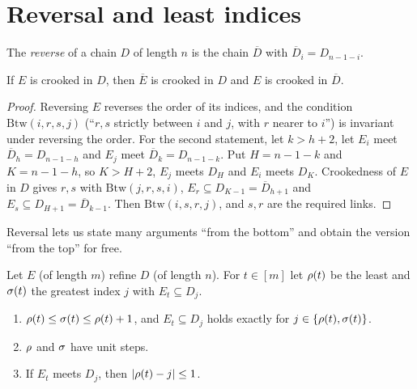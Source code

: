 
\section{Reversal and least indices}

\begin{definition}
The \emph{reverse} of a chain $D$ of length $n$ is the chain $\overline D$ with
$\overline D_i=D_{n-1-i}$.
\end{definition}

\begin{lemma}\label{lem:reverse}
If $E$ is crooked in $D$, then $\overline E$ is crooked in $D$ and $E$ is crooked in $\overline D$.
\end{lemma}

\begin{proof}
Reversing $E$ reverses the order of its indices, and the condition $\mathrm{Btw}(i,r,s,j)$ (``$r,s$ strictly
between $i$ and $j$, with $r$ nearer to $i$'') is invariant under reversing the order. For the second
statement, let $k>h+2$, let $E_i$ meet $\overline D_h=D_{n-1-h}$ and $E_j$ meet $\overline D_k=D_{n-1-k}$.
Put $H=n-1-k$ and $K=n-1-h$, so $K>H+2$, $E_j$ meets $D_H$ and $E_i$ meets $D_K$. Crookedness of $E$ in $D$
gives $r,s$ with $\mathrm{Btw}(j,r,s,i)$, $E_r\subseteq D_{K-1}=\overline D_{h+1}$ and $E_s\subseteq
D_{H+1}=\overline D_{k-1}$. Then $\mathrm{Btw}(i,s,r,j)$, and $s,r$ are the required links.
\end{proof}


Reversal lets us state many arguments ``from the bottom'' and obtain the version ``from the top'' for free.

\begin{definition}\label{def:minidx}
Let $E$ (of length $m$) refine $D$ (of length $n$). For $t\in[m]$ let $\rho(t)$ be the least and $\sigma(t)$ the
greatest index $j$ with $E_t\subseteq D_j$.
\end{definition}

\begin{lemma}\label{lem:minidx}
\begin{enumerate}[label=(\alph*)]
\item $\rho(t)\le\sigma(t)\le\rho(t)+1$, and $E_t\subseteq D_j$ holds exactly for $j\in\left\{ \rho(t),\sigma(t) \right\}$.
\item $\rho$ and $\sigma$ have unit steps.
\item If $E_t$ meets $D_j$, then $\left\lvert \rho(t)-j\right\rvert\le1$.
\end{enumerate}
\end{lemma}

